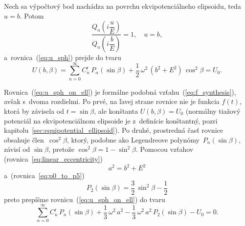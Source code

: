 \documentclass[a4paper, 12pt]{book}
\begin{document}
Nech sa výpočtový bod nachádza na povrchu ekvipotenciálneho elipsoidu, teda $u 
= b$.  Potom
%
\begin{equation}
\frac{Q_n\left( i \dfrac{u}{E} \right)}{Q_n\left( i \dfrac{b}{E} \right)} 
= 1{,} \quad u = b{,}
\end{equation}
%
a~rovnica~(\ref{eq:u_sph}) prejde do tvaru
%
\begin{equation}
\label{eq:u_sph_on_ell}
U(b, \beta) = \sum_{n = 0}^\infty C^{\mathrm{r}}_n \, P_n(\sin\beta) 
+ \frac{1}{2} \, \omega^2 \, (b^2 + E^2) \, \cos^2\beta = U_0{.}
\end{equation}

Rovnica~(\ref{eq:u_sph_on_ell}) je formálne podobná 
vzťahu~(\ref{eq:f_synthesis}), avšak s~dvoma rozdielmi.  Po prvé, na ľavej 
strane rovnice nie je funkcia $f(t)$, ktorá by závisela od $t = \sin\beta$, ale 
konštanta $U(b, \beta) = U_0$ (normálny tiažový potenciál na ekvipotenciálnom 
elipsoide je z~definície konštantný, pozri 
kapitolu~\ref{sec:equipotential_ellipsoid}).  Po druhé, prostredná časť rovnice 
obsahuje člen~$\cos^2\beta$, ktorý, podobne ako Legendreove 
polynómy~$P_n(\sin\beta)$, závisí od $\sin\beta$, pretože $\cos^2\beta 
= 1 - \sin^2\beta$.  Pomocou vzťahov (rovnica~\ref{eq:linear_eccentricity})
%
\begin{equation}
a^2 = b^2 + E^2
\end{equation}
%
a~(rovnica~\ref{eq:p0_to_p5})
%
\begin{equation}
P_2(\sin\beta) = \frac{3}{2} \, \sin^2\beta - \frac{1}{2}
\end{equation}
%
preto prepíšme rovnicu~(\ref{eq:u_sph_on_ell}) do tvaru
%
\begin{equation}
\label{eq:cnr}
\sum_{n = 0}^\infty C^{\mathrm{r}}_n \, P_n(\sin\beta) + \frac{1}{3} \, 
\omega^2 \, a^2  - \frac{1}{3} \, \omega^2 \, a^2 \, P_2(\sin\beta) - U_0 
= 0{.}
\end{equation}
\end{document}
